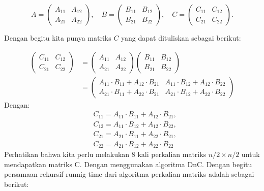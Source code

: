\documentclass[
  letterpaper,
  DIV=11,
  numbers=noendperiod]{scrartcl}
\begin{document}
\[
A=\left(\begin{array}{ll}
A_{11} & A_{12} \\
A_{21} & A_{22}
\end{array}\right), \quad B=\left(\begin{array}{ll}
B_{11} & B_{12} \\
B_{21} & B_{22}
\end{array}\right), \quad C=\left(\begin{array}{ll}
C_{11} & C_{12} \\
C_{21} & C_{22}
\end{array}\right
).
\]

Dengan begitu kita punya matriks \(C\) yang dapat dituliskan sebagai
berikut:

\[
\begin{aligned}
\left(\begin{array}{ll}
C_{11} & C_{12} \\
C_{21} & C_{22}
\end{array}\right) & =\left(\begin{array}{ll}
A_{11} & A_{12} \\
A_{21} & A_{22}
\end{array}\right)\left(\begin{array}{ll}
B_{11} & B_{12} \\
B_{21} & B_{22}
\end{array}\right) \\
& =\left(\begin{array}{ll}
A_{11} \cdot B_{11}+A_{12} \cdot B_{21} & A_{11} \cdot B_{12}+A_{12} \cdot B_{22} \\
A_{21} \cdot B_{11}+A_{22} \cdot B_{21} & A_{21} \cdot B_{12}+A_{22} \cdot B_{22}
\end{array}\right)
\end{aligned}
\] Dengan: \[
\begin{aligned}
& C_{11}=A_{11} \cdot B_{11}+A_{12} \cdot B_{21}, \\
& C_{12}=A_{11} \cdot B_{12}+A_{12} \cdot B_{22}, \\
& C_{21}=A_{21} \cdot B_{11}+A_{22} \cdot B_{21}, \\
& C_{22}=A_{21} \cdot B_{12}+A_{22} \cdot B_{22}
\end{aligned}
\] Perhatikan bahwa kita perlu melakukan 8 kali perkalian matriks
\(n/2 \times n/2\) untuk mendapatkan matriks C. Dengan menggunakan
algoritma DnC. Dengan begitu persamaan rekursif runnig time dari
algoritma perkalian matriks adalah sebagai berikut:
\end{document}
